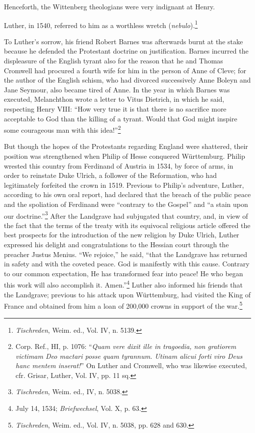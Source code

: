Henceforth, the Wittenberg theologians were very indignant at
Henry.

Luther, in 1540, referred to him as a worthless wretch (\textit{nebulo}).\footnote{\textit{Tischreden}, Weim. ed., Vol. IV, n. 5139.}

To Luther’s sorrow, his friend Robert Barnes was afterwards burnt at the stake
because he defended the Protestant doctrine on justification. Barnes incurred
the displeasure of the English tyrant also for the reason that he and Thomas
Cromwell had procured a fourth wife for him in the person of Anne of
Cleve; for the author of the English schism, who had divorced successively
Anne Boleyn and Jane Seymour, also became tired of Anne. In the year in
which Barnes was executed, Melanchthon wrote a letter to Vitus Dietrich,
in which he said, respecting Henry VIII: “How very true it is that there is
no sacrifice more acceptable to God than the killing of a tyrant. Would
that God might inspire some courageous man with this idea!”\footnote
{Corp. Ref., HI, p. 1076: “\textit{Quam vere dixit ille in tragoedia, non gratiorem victimam
Deo mactari posse quam tyrannum. Utinam alicui forti viro Deus hanc mentem inserat!}”
On Luther and Cromwell, who was likewise executed, cfr. Grisar, Luther, Vol. IV, pp.
11 sq.}

But though the hopes of the Protestants regarding England were
shattered, their position was strengthened when Philip of Hesse
conquered Württemburg. Philip wrested this country from Ferdinand
of Austria in 1534, by force of arms, in order to reinstate Duke
Ulrich, a follower of the Reformation, who had legitimately forfeited
the crown in 1519. Previous to Philip’s adventure, Luther, according
to his own oral report, had declared that the breach of the public
peace and the spoliation of Ferdinand were “contrary to the Gospel”
and “a stain upon our doctrine.”\footnote{\textit{Tischreden}, Weim. ed., IV, n. 5038.}
 After the Landgrave had subjugated
that country, and, in view of the fact that the terms of the
treaty with its equivocal religious article offered the best prospects
for the introduction of the new religion by Duke Ulrich, Luther
expressed his delight and congratulations to the Hessian court through
the preacher Justus Menius. “We rejoice,” he said, “that the Landgrave
has returned in safety and with the coveted peace. God is
manifestly with this cause. Contrary to our common expectation,
He has transformed fear into peace! He who began this work will
also accomplish it. Amen.”\footnote{July 14, 1534; \textit{Briefwechsel}, Vol. X, p. 63.}
 Luther also informed his friends that
the Landgrave; previous to his attack upon Württemburg, had visited
the King of France and obtained from him a loan of 200,000 crowns
in support of the war.\footnote{\textit{Tischreden}, Weim. ed., Vol. IV, n. 5038, pp. 628 and 630.}


